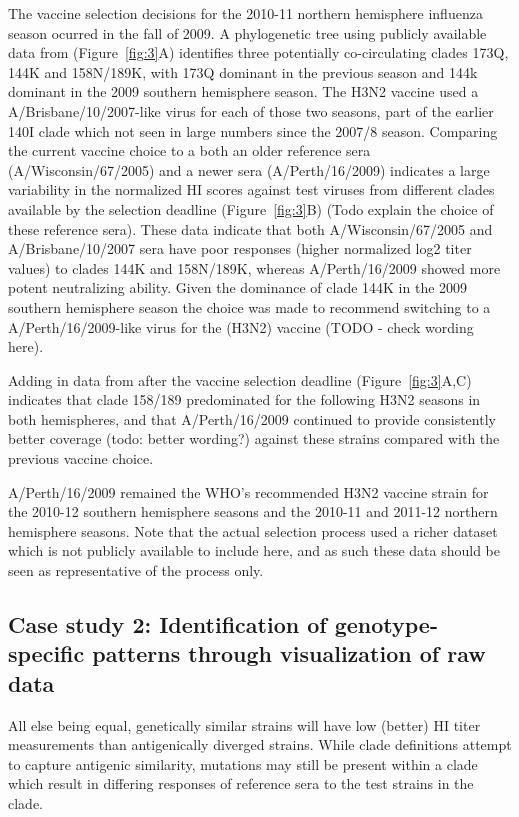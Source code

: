 \documentclass[utf8]{FrontiersinHarvard} %
\begin{document}
The vaccine selection decisions for the 2010-11 northern hemisphere influenza season ocurred in the fall of 2009.
A phylogenetic tree using publicly available data from \citep{Bedford:2014bf} (Figure~\ref{fig:3}A) identifies three potentially co-circulating clades 173Q, 144K and 158N/189K, with 173Q dominant in the previous season and 144k dominant in the 2009 southern hemisphere season.
The H3N2 vaccine used a A/Brisbane/10/2007-like virus for each of those two seasons, part of the earlier 140I clade which not seen in large numbers since the 2007/8 season.
Comparing the current vaccine choice to a both an older reference sera (A/Wisconsin/67/2005) and a newer sera (A/Perth/16/2009) indicates a large variability in the normalized HI scores against test viruses from different clades available by the selection deadline (Figure~\ref{fig:3}B) (Todo explain the choice of these reference sera).
These data indicate that both A/Wisconsin/67/2005 and A/Brisbane/10/2007 sera have poor responses (higher normalized log2 titer values) to clades 144K and 158N/189K, whereas A/Perth/16/2009 showed more potent neutralizing ability.
Given the dominance of clade 144K in the 2009 southern hemisphere season the choice was made to recommend switching to a A/Perth/16/2009-like virus for the (H3N2) vaccine (TODO - check wording here).


Adding in data from after the vaccine selection deadline (Figure~\ref{fig:3}A,C) indicates that clade 158/189 predominated for the following H3N2 seasons in both hemispheres, and that A/Perth/16/2009 continued to provide consistently better coverage (todo: better wording?) against these strains compared with the previous vaccine choice. 


A/Perth/16/2009 remained the WHO's recommended H3N2 vaccine strain for the 2010-12 southern hemisphere seasons and the 2010-11 and 2011-12 northern hemisphere seasons. Note that the actual selection process used a richer dataset which is not publicly available to include here, and as such these data should be seen as representative of the process only.


\subsection{Case study 2: Identification of genotype-specific patterns through visualization of raw data}

All else being equal, genetically similar strains will have low (better) HI titer measurements than antigenically diverged strains.
While clade definitions attempt to capture antigenic similarity, mutations may still be present within a clade which result in differing responses of reference sera to the test strains in the clade.
\end{document}

